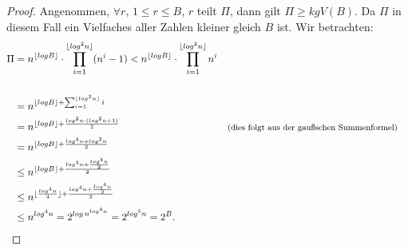 \documentclass[12pt,oneside]{article}
\theoremstyle{remark}
\theoremstyle{definition}
\begin{document}
\begin{proof}
Angenommen, $\forall r, \, 1 \leq r \leq B$, $r$ teilt $\Pi$, dann gilt $\Pi \geq kgV(B)$. Da $\Pi$ in diesem Fall ein Vielfaches aller Zahlen kleiner gleich $B$ ist.\newline
Wir betrachten:
\begin{equation}\label{long_p}
    \begin{split}
        \begin{aligned}
            \Pi &= n^{\lfloor log B \rfloor } \cdot \prod_{i = 1}^{\lfloor log^2 n \rfloor} (n^i - 1) 
                < n^{\lfloor log B \rfloor } \cdot \prod_{i = 1}^{\lfloor log^2 n \rfloor} n^i \\
                \\
                &= n^{\lfloor log B \rfloor + \sum_{i = 1}^{\lfloor log^2 n \rfloor } i}\\ 
                &= n^{\lfloor log B \rfloor + \frac{log^2 n \cdot (log^2 n + 1)}{2}} && \text{\footnotesize{(dies folgt aus der gaußschen Summenformel)}} \\
                &= n^{\lfloor log B \rfloor + \frac{log^4 n + log^2 n}{2}}\\
                & \leq n^{\lfloor log B \rfloor + \frac{log^4 n + \frac{log^4 n}{2}}{2}}\\
                & \leq n^{\lfloor \frac{log^4 n}{4} \rfloor + \frac{log^4 n + \frac{log^4 n}{2}}{2}}\\
                &\leq n^{log^4 n} = 2^{log \, n^{log^4 n}} = 2^{log^5 n} = 2^{B}.
        \end{aligned}
    \end{split}
\end{equation}


\end{proof}
\end{document}
